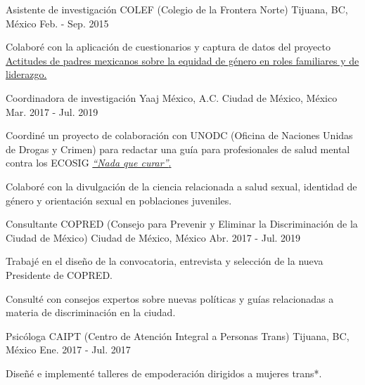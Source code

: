 \begin{cventries}
{\begin{cvitems}
            \end{cvitems}
        }
        \cventry
        {Asistente de investigación}
        {COLEF (Colegio de la Frontera Norte)}
        {Tijuana, BC, México}
        {Feb. - Sep. 2015}
        {
            \begin{cvitems}
            \item {Colaboré con la aplicación de cuestionarios y captura de datos del proyecto \href{https://estudiosdemograficosyurbanos.colmex.mx/index.php/edu/article/view/1791/pdf}{Actitudes de padres mexicanos sobre la equidad de género en roles familiares y de liderazgo.}}
            \end{cvitems}
        }
\end{cventries}
\vspace{-3.2mm}
\begin{cventries}
    \cventry
        {Coordinadora de investigación}
        {Yaaj México, A.C.}
        {Ciudad de México, México}
        {Mar. 2017 - Jul. 2019}
        {
            \begin{cvitems}
            \item {Coordiné un proyecto de colaboración con UNODC (Oficina de Naciones Unidas de Drogas y Crimen) para redactar una guía para profesionales de salud mental contra los ECOSIG \href{https://www.unodc.org/documents/mexicoandcentralamerica/2019/GUIAECOSIGFINAL-compressed.pdf}{\textit{``Nada que curar''}.}}
                \item {Colaboré con la divulgación de la ciencia relacionada a salud sexual, identidad de género y orientación sexual en poblaciones juveniles.}
            \end{cvitems}
        }
    \cventry
        {Consultante}
        {COPRED (Consejo para Prevenir y Eliminar la Discriminación de la Ciudad de México)}
        {Ciudad de México, México}
        {Abr. 2017 - Jul. 2019}
        {
            \begin{cvitems}
                \item {Trabajé en el diseño de la convocatoria, entrevista y selección de la nueva Presidente de COPRED.}
                \item {Consulté con consejos expertos sobre nuevas políticas y guías relacionadas a materia de discriminación en la ciudad.}
            \end{cvitems}
        }
    \cventry
        {Psicóloga}
        {CAIPT (Centro de Atención Integral a Personas Trans)}
        {Tijuana, BC, México}
        {Ene. 2017 - Jul. 2017}
        {
            \begin{cvitems}
                \item {Diseñé e implementé talleres de empoderación dirigidos a mujeres trans*.}
            \end{cvitems}
        }
\end{cventries}
